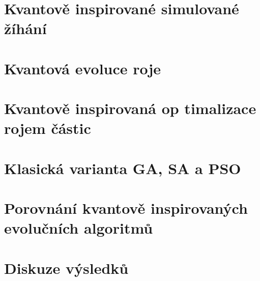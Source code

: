 \section{Kvantově inspirované simulované žíhání}\label{sec:exp-qiga}
\section{Kvantová evoluce roje}\label{sec:exp-qse}
\section{Kvantově inspirovaná op timalizace rojem částic}\label{sec:exp-qipso}
\section{Klasická varianta GA, SA a PSO}\label{sec:exp-ea}
\section{Porovnání kvantově inspirovaných evolučních algoritmů}
\section{Diskuze výsledků}